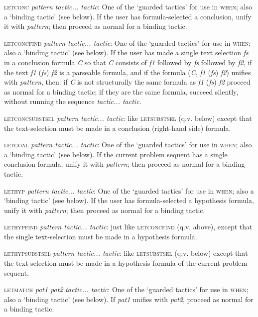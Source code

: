 \textsc{letconc} \textit{pattern tactic... tactic}: One of the `guarded tactics' for use in \textsc{when}; also a `binding tactic' (see below). If the user has formula-selected a conclusion, unify it with \textit{pattern}; then proceed as normal for a binding tactic.

\textsc{letconcfind} \textit{pattern tactic... tactic}: One of the `guarded tactics' for use in \textsc{when}; also a `binding tactic' (see below). If the user has made a single text selection \textit{fs} in a conclusion formula \textit{C} so that \textit{C} consists of \textit{f1} followed by \textit{fs} followed by \textit{f2}, if the text \textit{f1} (\textit{fs}) \textit{f2} is a parseable formula, and if the formula (\textit{C}, \textit{f1} (\textit{fs}) \textit{f2}) unifies with \textit{pattern}, then: if \textit{C} is not structurally the same formula as \textit{f1} (\textit{fs}) \textit{f2} proceed as normal for a binding tactic; if they are the same formula, succeed silently, without running the sequence \textit{tactic... tactic}.


\textsc{letconcsubstsel} \textit{pattern tactic... tactic}: like \textsc{letsubstsel} (q.v. below) except that the text-selection must be made in a conclusion (right-hand side) formula.

\textsc{letgoal} \textit{pattern tactic... tactic}: One of the `guarded tactics' for use in \textsc{when}; also a `binding tactic' (see below). If the current problem sequent has a single conclusion formula, unify it with \textit{pattern}; then proceed as normal for a binding tactic.

\textsc{lethyp} \textit{pattern tactic... tactic}: One of the `guarded tactics' for use in \textsc{when}; also a `binding tactic' (see below). If the user has formula-selected a hypothesis formula, unify it with \textit{pattern}; then proceed as normal for a binding tactic.


\textsc{lethypfind} \textit{pattern tactic... tactic}: just like \textsc{letconcfind} (q.v. above), except that the single text-selection must be made in a hypothesis formula.

\textsc{lethypsubstsel} \textit{pattern tactic... tactic}: like \textsc{letsubstsel} (q.v. below) except that the text-selection must be made in a hypothesis formula of the current problem sequent.

\textsc{letmatch} \textit{pat1 pat2} \textit{tactic... tactic}: One of the `guarded tactics' for use in \textsc{when}; also a `binding tactic' (see below). If \textit{pat1} unifies with \textit{pat2}, proceed as normal for a binding tactic.


